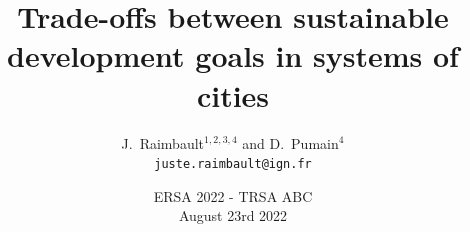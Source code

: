 \documentclass[english,11pt]{beamer}
\begin{document}
\title{Trade-offs between sustainable development goals in systems of cities}

\author{J.~Raimbault$^{1,2,3,4}$ and D.~Pumain$^4$\\
\texttt{juste.raimbault@ign.fr}
}






\date{ERSA 2022 - TRSA ABC\\
August 23rd 2022
}


\end{document}
